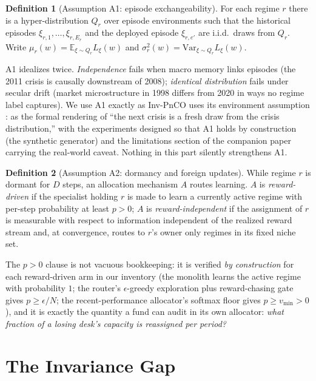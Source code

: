 \documentclass[11pt,a4paper]{article}
\theoremstyle{definition}
\newtheorem{definition}{Definition}[section]
\theoremstyle{plain}
\newcommand{\E}{\mathbb{E}}
\newcommand{\Var}{\mathrm{Var}}
\begin{document}
\begin{definition}[Assumption A1: episode exchangeability]
\label{def:dd4-a1}
For each regime $r$ there is a hyper-distribution $Q_r$ over episode
environments such that the historical episodes
$\xi_{r,1}, \dots, \xi_{r,E_r}$ and the deployed episode $\xi_{r,e'}$
are i.i.d.\ draws from $Q_r$. Write
$\mu_r(w) = \E_{\xi \sim Q_r} L_\xi(w)$ and
$\sigma_r^2(w) = \Var_{\xi \sim Q_r} L_\xi(w)$.
\end{definition}

\begin{warning}
A1 idealizes twice. \emph{Independence} fails when macro memory links
episodes (the 2011 crisis is causally downstream of 2008); \emph{identical
distribution} fails under secular drift (market microstructure in 1998
differs from 2020 in ways no regime label captures). We use A1 exactly as
Inv-PnCO uses its environment assumption \cite{yan2026invpnco}: as the
formal rendering of ``the next crisis is a fresh draw from the crisis
distribution,'' with the experiments designed so that A1 holds by
construction (the synthetic generator) and the limitations section of the
companion paper carrying the real-world caveat. Nothing in this part
silently strengthens A1.
\end{warning}

\begin{definition}[Assumption A2: dormancy and foreign updates]
\label{def:dd4-a2}
While regime $r$ is dormant for $D$ steps, an allocation mechanism $A$
routes learning. $A$ is \emph{reward-driven} if the specialist holding
$r$ is made to learn a currently active regime with per-step probability
at least $p > 0$; $A$ is \emph{reward-independent} if the assignment of
$r$ is measurable with respect to information independent of the
realized reward stream and, at convergence, routes to $r$'s owner only
regimes in its fixed niche set.
\end{definition}

The $p > 0$ clause is not vacuous bookkeeping: it is verified \emph{by
construction} for each reward-driven arm in our inventory (the monolith
learns the active regime with probability $1$; the router's
$\epsilon$-greedy exploration plus reward-chasing gate gives
$p \ge \epsilon / N$; the recent-performance allocator's softmax floor
gives $p \ge v_{\min} > 0$), and it is exactly the quantity a fund can
audit in its own allocator: \emph{what fraction of a losing desk's
capacity is reassigned per period?}

\section{The Invariance Gap}
\label{sec:dd4-invgap}
\end{document}

